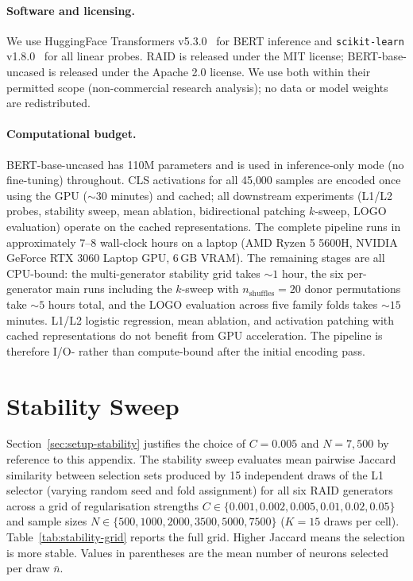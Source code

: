 \documentclass[11pt]{article}
\newcommand{\bertbase}{BERT-base-uncased\xspace}
\begin{document}
\paragraph{Software and licensing.}
We use HuggingFace Transformers v5.3.0~\citep{wolf2020transformers} for BERT inference and \texttt{scikit-learn} v1.8.0~\citep{scikit-learn} for all linear probes. RAID is released under the MIT license; \bertbase is released under the Apache 2.0 license. We use both within their permitted scope (non-commercial research analysis); no data or model weights are redistributed.

\paragraph{Computational budget.}
\bertbase has 110M parameters and is used in inference-only mode (no fine-tuning) throughout. CLS activations for all 45{,}000 samples are encoded once using the GPU (${\sim}30$ minutes) and cached; all downstream experiments (L1/L2 probes, stability sweep, mean ablation, bidirectional patching $k$-sweep, LOGO evaluation) operate on the cached representations. The complete pipeline runs in approximately 7--8 wall-clock hours on a laptop (AMD Ryzen 5 5600H, NVIDIA GeForce RTX 3060 Laptop GPU, 6\,GB VRAM). The remaining stages are all CPU-bound: the multi-generator stability grid takes ${\sim}1$ hour, the six per-generator main runs including the $k$-sweep with $n_{\text{shuffles}}=20$ donor permutations take ${\sim}5$ hours total, and the LOGO evaluation across five family folds takes ${\sim}15$ minutes. L1/L2 logistic regression, mean ablation, and activation patching with cached representations do not benefit from GPU acceleration. The pipeline is therefore I/O- rather than compute-bound after the initial encoding pass.

\section{Stability Sweep}
\label{app:stability}

Section~\ref{sec:setup-stability} justifies the choice of $C=0.005$ and $N=7{,}500$ by reference to this appendix. The stability sweep evaluates mean pairwise Jaccard similarity between selection sets produced by 15 independent draws of the L1 selector (varying random seed and fold assignment) for all six RAID generators across a grid of regularisation strengths $C \in \{0.001, 0.002, 0.005, 0.01, 0.02, 0.05\}$ and sample sizes $N \in \{500, 1000, 2000, 3500, 5000, 7500\}$ ($K=15$ draws per cell). Table~\ref{tab:stability-grid} reports the full grid. Higher Jaccard means the selection is more stable. Values in parentheses are the mean number of neurons selected per draw $\bar{n}$.
\end{document}
